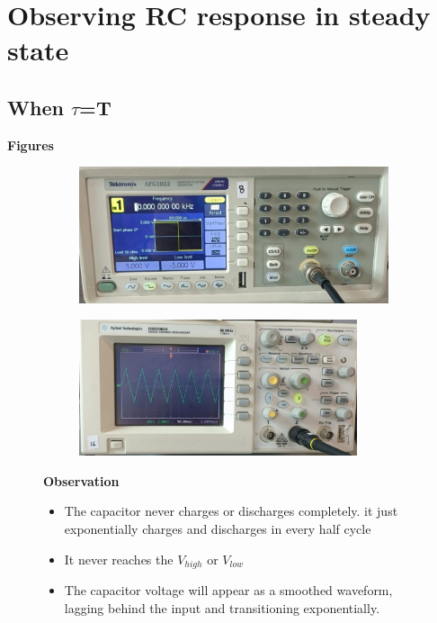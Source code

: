 \documentclass[a4paper,12pt]{article}
\begin{document}
\section{Observing RC response in steady state}
\subsection{When $\tau$=T}
\begin{itemize}
    \item \textbf{Figures}
    \begin{figure}[H]
    \centering
    \begin{subfigure}{0.48\textwidth}
        \centering
        \includegraphics[height=4cm]{figs/inputrc==t.jpeg}
    \end{subfigure}
    \hspace{0.04\textwidth} %
    \begin{subfigure}{0.48\textwidth}
        \centering
        \includegraphics[height=4cm]{figs/outputrc==t.jpeg}
    \end{subfigure}
    \item \textbf{Observation}
    \begin{itemize}
        \item The capacitor never charges or discharges completely. it just exponentially charges and discharges in every half cycle
        \item It never reaches the $V_{high}$ or $V_{low}$
        \item The capacitor voltage will appear as a smoothed waveform, lagging behind the input and transitioning exponentially.
    \end{itemize}
\end{figure}
\end{itemize}
\newpage
\end{document}
